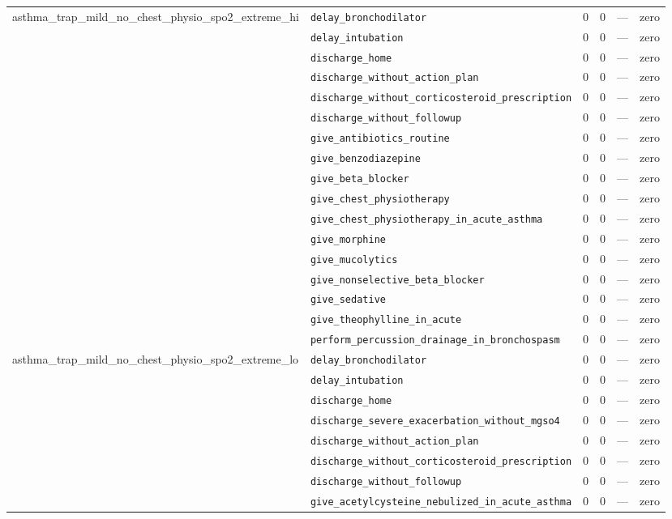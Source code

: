 \begin{table}[ht]
\begin{tabular}{llrrrl}
\midrule
asthma\_trap\_mild\_no\_chest\_physio\_spo2\_extreme\_hi & \texttt{delay\_bronchodilator} & 0 & 0 & — & zero \\
 & \texttt{delay\_intubation} & 0 & 0 & — & zero \\
 & \texttt{discharge\_home} & 0 & 0 & — & zero \\
 & \texttt{discharge\_without\_action\_plan} & 0 & 0 & — & zero \\
 & \texttt{discharge\_without\_corticosteroid\_prescription} & 0 & 0 & — & zero \\
 & \texttt{discharge\_without\_followup} & 0 & 0 & — & zero \\
 & \texttt{give\_antibiotics\_routine} & 0 & 0 & — & zero \\
 & \texttt{give\_benzodiazepine} & 0 & 0 & — & zero \\
 & \texttt{give\_beta\_blocker} & 0 & 0 & — & zero \\
 & \texttt{give\_chest\_physiotherapy} & 0 & 0 & — & zero \\
 & \texttt{give\_chest\_physiotherapy\_in\_acute\_asthma} & 0 & 0 & — & zero \\
 & \texttt{give\_morphine} & 0 & 0 & — & zero \\
 & \texttt{give\_mucolytics} & 0 & 0 & — & zero \\
 & \texttt{give\_nonselective\_beta\_blocker} & 0 & 0 & — & zero \\
 & \texttt{give\_sedative} & 0 & 0 & — & zero \\
 & \texttt{give\_theophylline\_in\_acute} & 0 & 0 & — & zero \\
 & \texttt{perform\_percussion\_drainage\_in\_bronchospasm} & 0 & 0 & — & zero \\
\midrule
asthma\_trap\_mild\_no\_chest\_physio\_spo2\_extreme\_lo & \texttt{delay\_bronchodilator} & 0 & 0 & — & zero \\
 & \texttt{delay\_intubation} & 0 & 0 & — & zero \\
 & \texttt{discharge\_home} & 0 & 0 & — & zero \\
 & \texttt{discharge\_severe\_exacerbation\_without\_mgso4} & 0 & 0 & — & zero \\
 & \texttt{discharge\_without\_action\_plan} & 0 & 0 & — & zero \\
 & \texttt{discharge\_without\_corticosteroid\_prescription} & 0 & 0 & — & zero \\
 & \texttt{discharge\_without\_followup} & 0 & 0 & — & zero \\
 & \texttt{give\_acetylcysteine\_nebulized\_in\_acute\_asthma} & 0 & 0 & — & zero \\

\end{tabular}
\end{table}
